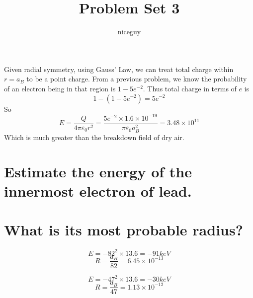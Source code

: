 \documentclass[answers]{exam}
\author{niceguy}
\title{Problem Set 3}
\begin{document}
\maketitle

\begin{questions}


\begin{solution}
	Given radial symmetry, using Gauss' Law, we can treat total charge within $r=a_B$ to be a point charge. From a previous problem, we know the probability of an electron being in that region is $1-5e^{-2}$. Thus total charge in terms of $e$ is
	$$1-(1-5e^{-2}) = 5e^{-2}$$
	So
	$$E = \frac{Q}{4\pi\varepsilon_0r^2} = \frac{5e^{-2}\times1.6\times10^{-19}}{\pi\varepsilon_0a_B^2} = 3.48\times10^{11}$$
	Which is much greater than the breakdown field of dry air.
\end{solution}

\question{}

\begin{parts}
	\part{Estimate the energy of the innermost electron of lead.}
	\part{What is its most probable radius?}
\end{parts}

\begin{solution}
	$$E = -82^2\times13.6 = -91\unit{keV}$$
	$$R = \frac{a_B}{82} = 6.45\times10^{-13}$$
\end{solution}


\begin{solution}
	$$E = -47^2\times13.6 = -30\unit{keV}$$
	$$R = \frac{a_B}{47} = 1.13\times10^{-12}$$
\end{solution}



\end{questions}
\end{document}
